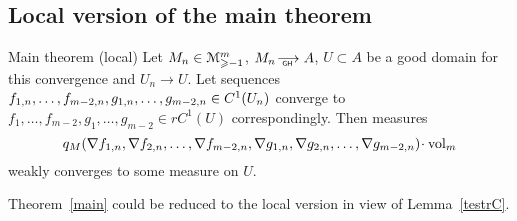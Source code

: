 

 
 
 
 \subsection{Local version of the main theorem }\label{sec:loc}
 
 
\begin{thm}{Main theorem (local)}\label{mainloc}
Let   
$M_n\in\mathcal M_{\geqslant -1}^m$,
$M_n\GHto A$, 
  $U\subset A$ be a good domain for this convergence
  and $U_n\to U$.
  Let sequences $f_{1,n},\dots,f_{m-2,n},\\ g_{1,n},\dots,g_{m-2,n}\in C^1(U_n)$ 
 converge to
   $f_1,\dots, f_{m-2}, g_1,\dots, g_{m-2}\in rC^1(U)$ correspondingly.
Then measures 
$${q}_M(\nabla f_{1,n},\nabla f_{2,n},\dots,\nabla f_{m-2,n},
\nabla g_{1,n},\nabla g_{2,n},\dots,\nabla g_{m-2,n})\cdot\vol_m$$ weakly converges to some
measure on $U$.
\end{thm}

Theorem~\ref{main} could be reduced to the local version
in view of Lemma~\ref{testrC}.
